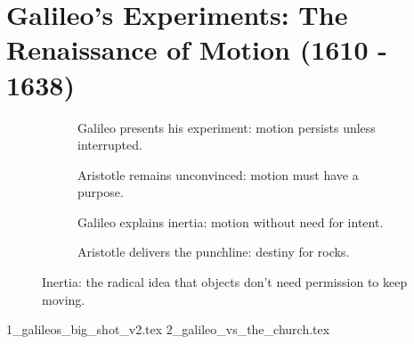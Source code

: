 \section{Galileo’s Experiments: The Renaissance of Motion (1610 - 1638)}


\begin{figure}[H]
  \centering

  \begin{subfigure}[t]{0.45\textwidth}
  \centering
  \caption*{Galileo presents his experiment: motion persists unless interrupted.}
  \end{subfigure}
  \hfill
  \begin{subfigure}[t]{0.45\textwidth}
  \centering
  \caption*{Aristotle remains unconvinced: motion must have a purpose.}
  \end{subfigure}

  \vspace{1em}

  \begin{subfigure}[t]{0.45\textwidth}
  \centering
  \caption*{Galileo explains inertia: motion without need for intent.}
  \end{subfigure}
  \hfill
  \begin{subfigure}[t]{0.45\textwidth}
  \centering
  \caption*{Aristotle delivers the punchline: destiny for rocks.}
  \end{subfigure}

  \caption*{Inertia: the radical idea that objects don’t need permission to keep moving.}
\end{figure}


{1_galileos_big_shot_v2.tex}
{2_galileo_vs_the_church.tex}